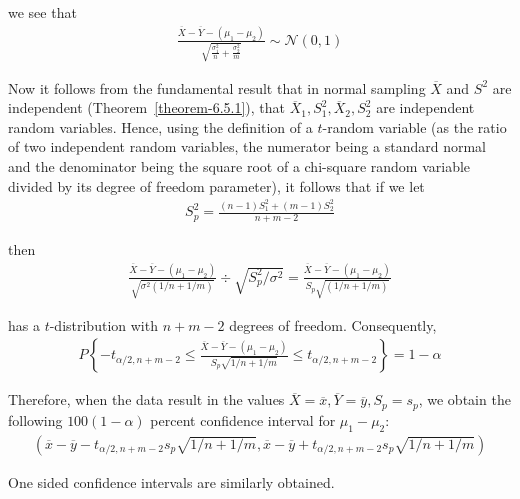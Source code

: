 \documentclass[12pt]{article}
\begin{document}
we see that
\begin{eqnarray*}
  \frac {\overline{X} - \overline{Y} - (\mu_1 - \mu_2)}
  {\sqrt {\frac{\sigma_1^2}{n} + \frac{\sigma_2^2}{m}}}
  \sim \mathcal{N} (0,1)
\end{eqnarray*}

Now it follows from the fundamental result that in normal sampling $\overline{X}$ and $S^2$ are independent (Theorem~\ref{theorem-6.5.1}), that $\overline{X}_1, S_1^2, \overline{X}_2, S_2^2$ are independent random variables. Hence, using the definition of a $t$-random variable (as the ratio of two independent random variables, the numerator being a standard normal and the denominator being the square root of a chi-square random variable divided by its degree of freedom parameter), it follows that if we let
\begin{eqnarray*}
  S_p^2 = \frac {(n-1)S_1^2 + (m-1)S_2^2}{n+m-2}
\end{eqnarray*}

then
\begin{eqnarray*}
  \frac {\overline{X} - \overline{Y} - (\mu_1 - \mu_2)}
  {\sqrt {\sigma^2 (1 / n + 1 / m)}}
  \div \sqrt{S_p^2 / \sigma^2}
  = \frac {\overline{X} - \overline{Y} - (\mu_1 - \mu_2)}
  {S_p \sqrt { (1 / n + 1 / m)}}
\end{eqnarray*}

has a $t$-distribution with $n+m-2$ degrees of freedom. Consequently,
\begin{eqnarray*}
  P \left\{ - t_{\alpha / 2, n+m-2} \le
    \frac {\overline{X} - \overline{Y} - (\mu_1 - \mu_2)}
    {S_p \sqrt {1 / n + 1 / m}}
    \le t_{\alpha / 2, n+m-2} \right\} = 1 - \alpha
\end{eqnarray*}

Therefore, when the data result in the values $\overline{X} = \overline{x}, \overline{Y} = \overline{y}, S_p = s_p$, we obtain the following $100(1 - \alpha)$ percent confidence interval for $\mu_1 - \mu_2$:
\begin{eqnarray*}
  \left( \overline{x} - \overline{y} - t_{\alpha / 2, n+m-2}
    s_p \sqrt{1/n + 1/m}, \overline{x} - \overline{y} + t_{\alpha / 2, n+m-2}
    s_p \sqrt{1/n + 1/m} \right)
\end{eqnarray*}

One sided confidence intervals are similarly obtained. \\
\end{document}
